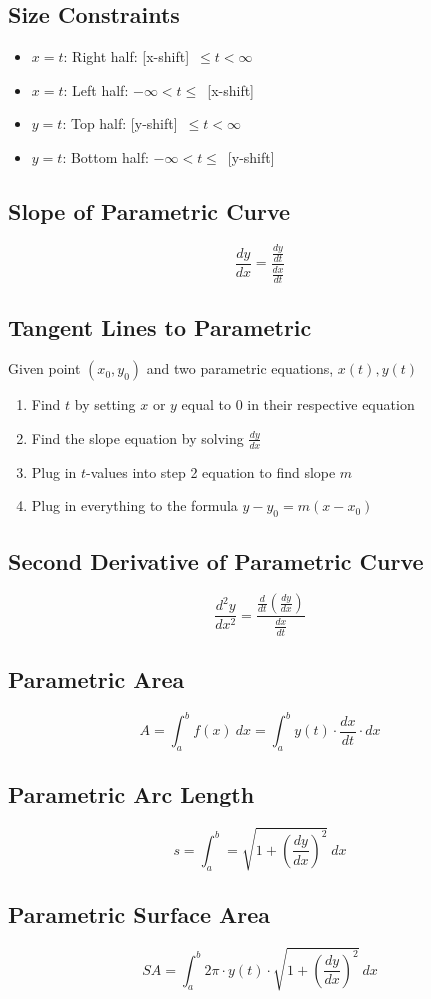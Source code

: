 \documentclass[12pt]{article}
\begin{document}
\subsection{Size Constraints}
\begin{itemize}
    \item $x=t$: Right half: [x-shift]\ $\leq t < \infty$
    \item $x=t$: Left half: $-\infty < t \leq$\ [x-shift]
    \item $y=t$: Top half: [y-shift]\ $\leq t < \infty$
    \item $y=t$: Bottom half: $-\infty < t \leq$\ [y-shift]
\end{itemize}

\subsection{Slope of Parametric Curve}
$$\frac{dy}{dx} = \frac{\frac{dy}{dt}}{\frac{dx}{dt}}$$

\subsection{Tangent Lines to Parametric}
Given point $(x_0, y_0)$ and two parametric equations, $x(t), y(t)$
\begin{enumerate}
    \item Find $t$ by setting $x$ or $y$ equal to $0$ in their respective equation
    \item Find the slope equation by solving $\frac{dy}{dx}$
    \item Plug in $t$-values into step 2 equation to find slope $m$
    \item Plug in everything to the formula $y-y_0=m(x-x_0)$
\end{enumerate}

\subsection{Second Derivative of Parametric Curve}
$$\frac{d^2y}{dx^2} = \frac{\frac{d}{dt}\left(\frac{dy}{dx}\right)}{\frac{dx}{dt}}$$

\subsection{Parametric Area}
$$A=\int_a^b f(x) \ dx = \int_a^b y(t) \cdot \frac{dx}{dt} \cdot dx$$

\subsection{Parametric Arc Length}
$$s=\int_a^b = \sqrt{1+\left(\frac{dy}{dx}\right)^2}\ dx$$

\subsection{Parametric Surface Area}
$$SA = \int_a^b  2\pi \cdot y(t) \cdot \sqrt{1+\left(\frac{dy}{dx}\right)^2}\ dx$$
\end{document}
